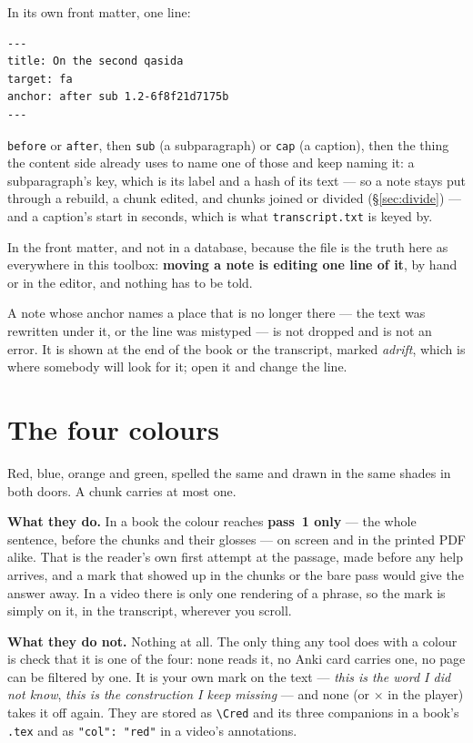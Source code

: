\documentclass[11pt,oneside]{report}
\newcommand{\file}[1]{\texttt{#1}}
\newcommand{\menu}[1]{\textsf{#1}}
\begin{document}
In its own front matter, one line:

\begin{lstlisting}
---
title: On the second qasida
target: fa
anchor: after sub 1.2-6f8f21d7175b
---
\end{lstlisting}

\noindent \texttt{before} or \texttt{after}, then \texttt{sub} (a
subparagraph) or \texttt{cap} (a caption), then the thing the content side
already uses to name one of those and keep naming it: a subparagraph's key,
which is its label and a hash of its text --- so a note stays put through a
rebuild, a chunk edited, and chunks joined or divided (\S\ref{sec:divide}) ---
and a caption's start in seconds, which is what \file{transcript.txt} is
keyed by.

In the front matter, and not in a database, because the file is the truth
here as everywhere in this toolbox: \textbf{moving a note is editing one line
of it}, by hand or in the editor, and nothing has to be told.

A note whose anchor names a place that is no longer there --- the text was
rewritten under it, or the line was mistyped --- is not dropped and is not an
error. It is shown at the end of the book or the transcript, marked
\emph{adrift}, which is where somebody will look for it; open it and change
the line.

\section{The four colours}
\label{sec:colours}

Red, blue, orange and green, spelled the same and drawn in the same shades in
both doors. A chunk carries at most one.

\textbf{What they do.} In a book the colour reaches \textbf{pass~1 only} ---
the whole sentence, before the chunks and their glosses --- on screen and in
the printed PDF alike. That is the reader's own first attempt at the passage,
made before any help arrives, and a mark that showed up in the chunks or the
bare pass would give the answer away. In a video there is only one rendering
of a phrase, so the mark is simply on it, in the transcript, wherever you
scroll.

\textbf{What they do not.} Nothing at all. The only thing any tool does with
a colour is check that it is one of the four: none reads it, no Anki card
carries one, no page can be filtered by one. It is your own
mark on the text --- \emph{this is the word I did not know}, \emph{this is the
construction I keep missing} --- and \menu{none} (or \menu{$\times$} in the
player) takes it off again. They are stored as \verb|\Cred| and its three
companions in a book's \file{.tex} and as \texttt{"col": "red"} in a video's
annotations.
\end{document}

